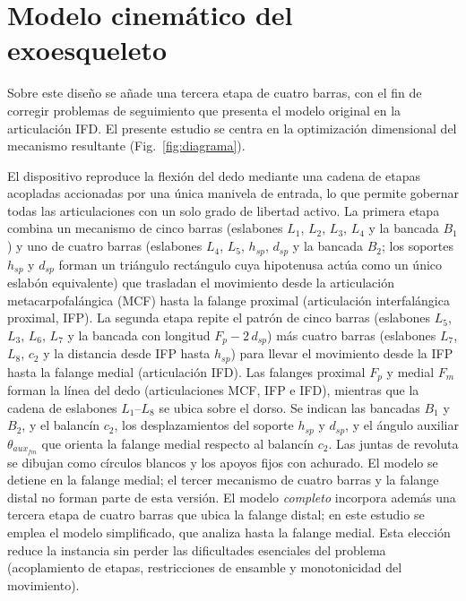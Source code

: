 \documentclass[conference]{IEEEtran}
\begin{document}


\section{Modelo cinemático del exoesqueleto}
Sobre este diseño
se añade una tercera etapa de cuatro barras, con el fin de corregir problemas de
seguimiento que presenta el modelo original en la articulación IFD. El presente
estudio se centra en la optimización dimensional del mecanismo resultante
(Fig.~\ref{fig:diagrama}).

El dispositivo reproduce la flexión del dedo mediante una cadena de etapas
acopladas accionadas por una única manivela de entrada, lo que permite gobernar
todas las articulaciones con un solo grado de libertad activo. La primera etapa
combina un mecanismo de cinco barras (eslabones $L_1$, $L_2$, $L_3$, $L_4$ y la
bancada $B_1$) y uno de cuatro barras (eslabones $L_4$, $L_5$, $h_{sp}$,
$d_{sp}$ y la bancada $B_2$; los soportes $h_{sp}$ y $d_{sp}$ forman un
triángulo rectángulo cuya hipotenusa actúa como un único eslabón equivalente) que
trasladan el movimiento desde la articulación metacarpofalángica (MCF) hasta la
falange proximal (articulación interfalángica proximal, IFP). La segunda etapa
repite el patrón de cinco barras (eslabones $L_5$, $L_3$, $L_6$, $L_7$ y la
bancada con longitud $F_p - 2\,d_{sp}$) más cuatro barras (eslabones $L_7$,
$L_8$, $c_2$ y la distancia desde IFP hasta $h_{sp}$) para llevar el movimiento
desde la IFP hasta la falange medial (articulación IFD). Las falanges proximal
$F_p$ y medial $F_m$ forman la línea del dedo (articulaciones MCF, IFP e IFD),
mientras que la cadena de eslabones $L_1$--$L_8$ se ubica sobre el dorso. Se
indican las bancadas $B_1$ y $B_2$, y el balancín $c_2$, los desplazamientos del
soporte $h_{sp}$ y $d_{sp}$, y el ángulo auxiliar $\theta_{aux_{fm}}$ que orienta
la falange medial respecto al balancín $c_2$. Las juntas de revoluta se dibujan
como círculos blancos y los apoyos fijos con achurado. El modelo se detiene en la
falange medial; el tercer mecanismo de cuatro barras y la falange distal no
forman parte de esta versión. El modelo \emph{completo} incorpora además una
tercera etapa de cuatro barras que ubica la falange distal; en este estudio se
emplea el modelo simplificado, que analiza hasta la falange medial. Esta elección
reduce la instancia sin perder las dificultades esenciales del problema
(acoplamiento de etapas, restricciones de ensamble y monotonicidad del
movimiento).
\end{document}

